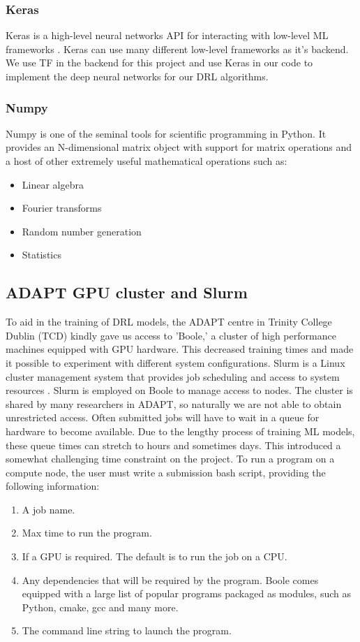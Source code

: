 \subsubsection{Keras}
Keras is a high-level neural networks API for interacting with low-level ML frameworks \cite{keras}. Keras can use many different low-level frameworks as it's backend. We use TF in the backend for this project and use Keras in our code to implement the deep neural networks for our DRL algorithms.

\subsubsection{Numpy}
Numpy is one of the seminal tools for scientific programming in Python. It provides an N-dimensional matrix object with support for matrix operations and a host of other extremely useful mathematical operations such as:
\begin{itemize}
	\item Linear algebra
	\item Fourier transforms
	\item Random number generation
	\item Statistics
\end{itemize}


\subsection{ADAPT GPU cluster and Slurm} \label{subsec:boole}
To aid in the training of DRL models, the ADAPT centre in Trinity College Dublin (TCD) kindly gave us access to 'Boole,' a cluster of high performance machines equipped with GPU hardware. This decreased training times and made it possible to experiment with different system configurations. Slurm is a Linux cluster management system that provides job scheduling and access to system resources \cite{slurm}. Slurm is employed on Boole to manage access to nodes. The cluster is shared by many researchers in ADAPT, so naturally we are not able to obtain unrestricted access. Often submitted jobs will have to wait in a queue for hardware to become available. Due to the lengthy process of training ML models, these queue times can stretch to hours and sometimes days. This introduced a somewhat challenging time constraint on the project. To run a program on a compute node, the user must write a submission bash script, providing the following information:

\begin{enumerate}
	\item A job name.
	\item Max time to run the program.
	\item If a GPU is required. The default is to run the job on a CPU.
	\item Any dependencies that will be required by the program. Boole comes equipped with a large list of popular programs packaged as modules, such as Python, cmake, gcc and many more.
	\item The command line string to launch the program.
\end{enumerate}

